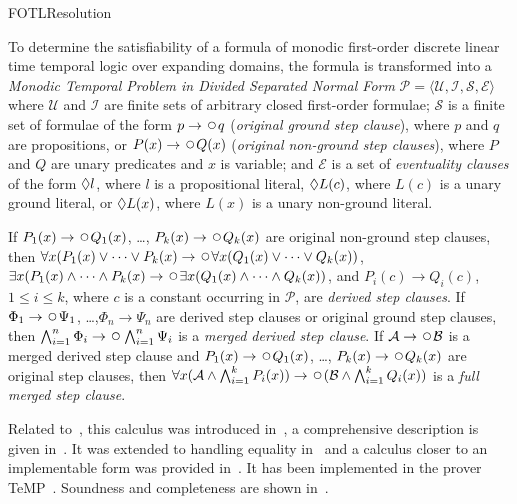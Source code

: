 \begin{entry}{FOTLResolution}
\begin{clarifications}
  To determine the satisfiability of a formula of monodic first-order
  discrete linear time temporal logic over expanding domains, the
  formula is transformed into a \emph{Monodic Temporal Problem
  in Divided Separated Normal Form}
  $\mathcal{P} = \langle \mathcal{U, I, S, E} \rangle$ 
  where $\mathcal{U}$
  and $\mathcal{I}$ 
  are finite sets of arbitrary closed first-order formulae;
  $\mathcal{S}$ 
  is a finite set of formulae of the form
  $p\rightarrow\Next q$ (\emph{original ground step clause}), 
  where $p$ and $q$ are propositions, or
  $P(x)\rightarrow\Next Q(x)$ (\emph{original non-ground step clauses}), 
  where $P$ and $Q$ are unary predicates and $x$ is variable; and
  $\mathcal{E}$  
  is a set of \emph{eventuality clauses}
  of the form $\Diamond l$, where $l$ is a propositional literal,
  $\Diamond L(c)$, where $L(c)$ is a unary ground literal,
  or
  $\Diamond L(x)$, where $L(x)$ is a unary non-ground literal.
  
  If $P_1(x)\rightarrow\Next Q_1(x)$, \dots, $P_k(x)\rightarrow\Next Q_k(x)$ are
  original non-ground step clauses, then
  $\forall x (P_1(x)\lor\dots\lor P_k(x)\rightarrow\Next
   \forall x (Q_1(x)\lor\dots\lor Q_k(x))$,
  $\exists x (P_1(x)\land\dots\land P_k(x)\rightarrow\Next
   \exists x (Q_1(x)\land\dots\land Q_k(x))$, and
  $P_i(c)\rightarrow Q_i(c)$, $1\leq i\leq k$, where $c$ is a constant
  occurring in $\mathcal{P}$, are \emph{derived step clauses}.
  If $\Phi_1\rightarrow\Next\Psi_1$, \dots,$\Phi_n\rightarrow\Psi_n$
  are derived step clauses or original ground step clauses, then
  $\bigwedge_{i=1}^n\Phi_i\rightarrow\Next\bigwedge_{i=1}^n\Psi_i$ is a
  \emph{merged derived step clause}. 
  If $\mathcal{A}\rightarrow\Next\mathcal{B}$ is a merged derived step
  clause and $P_1(x)\rightarrow\Next Q_1(x)$, \dots,
  $P_k(x)\rightarrow\Next Q_k(x)$ are original step clauses,
  then $\forall x (\mathcal{A}\land\bigwedge_{i=1}^k P_i(x))
  \rightarrow\Next (\mathcal{B}\land\bigwedge_{i=1}^k Q_i(x))$
  is a \emph{full merged step clause}.
\end{clarifications}

\begin{history}
  Related to~, this calculus was introduced
  in~\cite{Degtyarev+Fisher+Konev@CADE2003},
  a comprehensive description is given
  in~\cite{DBLP:journals/tocl/DegtyarevFK06}. It was 
  extended to handling equality in~\cite{Konev+Degtyarev+Fisher@LPAR2003} 
  and a calculus closer to an implementable form was provided 
  in~\cite{KDDFH05}. It has been implemented in the prover
  TeMP~\cite{DBLP:conf/cade/HustadtKRV04}.
  Soundness and completeness 
  are shown 
  in~\cite{DBLP:journals/tocl/DegtyarevFK06}. 
\end{history}

\end{entry}
